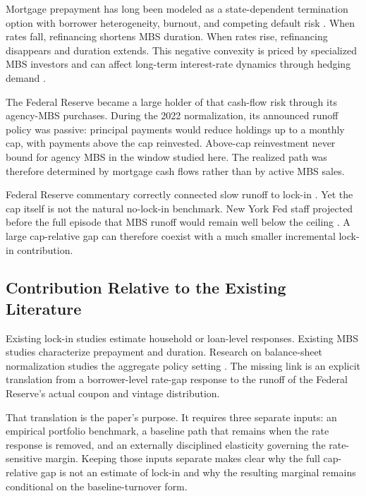 Mortgage prepayment has long been modeled as a state-dependent termination option with borrower heterogeneity, burnout, and competing default risk \citep{dunn1981,richard1989,schwartz1989,stanton1995,deng2000}. When rates fall, refinancing shortens MBS duration. When rates rise, refinancing disappears and duration extends. This negative convexity is priced by specialized MBS investors and can affect long-term interest-rate dynamics through hedging demand \citep{gabaix2007,malkhozov2016,diep2021}.

The Federal Reserve became a large holder of that cash-flow risk through its agency-MBS purchases. During the 2022 normalization, its announced runoff policy was passive: principal payments would reduce holdings up to a monthly cap, with payments above the cap reinvested. Above-cap reinvestment never bound for agency MBS in the window studied here. The realized path was therefore determined by mortgage cash flows rather than by active MBS sales.

Federal Reserve commentary correctly connected slow runoff to lock-in \citep{na2024,perli2024,hammack2025}. Yet the cap itself is not the natural no-lock-in benchmark. New York Fed staff projected before the full episode that MBS runoff would remain well below the ceiling \citep{nyfed2022}. A large cap-relative gap can therefore coexist with a much smaller incremental lock-in contribution.

\subsection{Contribution Relative to the Existing Literature}

Existing lock-in studies estimate household or loan-level responses. Existing MBS studies characterize prepayment and duration. Research on balance-sheet normalization studies the aggregate policy setting \citep{lopezsalido2023,acharya2023}. The missing link is an explicit translation from a borrower-level rate-gap response to the runoff of the Federal Reserve's actual coupon and vintage distribution.

That translation is the paper's purpose. It requires three separate inputs: an empirical portfolio benchmark, a baseline path that remains when the rate response is removed, and an externally disciplined elasticity governing the rate-sensitive margin. Keeping those inputs separate makes clear why the full cap-relative gap is not an estimate of lock-in and why the resulting marginal remains conditional on the baseline-turnover form.

